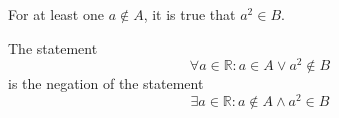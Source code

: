\documentclass[main.tex]{subfiles}
\begin{document}
\subproblem{}\label{4d}
For at least one \(a \notin A\), it is true that \(a^2 \in B\).

\begin{remark}
	The statement
	\[\forall a \in \mathbb{R}: a \in A \lor a^2 \notin B\]
	is the negation of the statement
	\[\exists a \in \mathbb{R}: a \notin A \land a^2 \in B\]
\end{remark}
\end{document}
